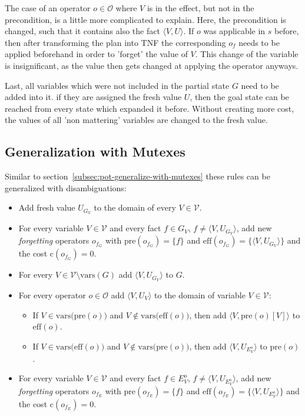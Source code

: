 The case of an operator $o\in\mathcal{O}$ where $V$ is in the effect, but not in the precondition, is a little more complicated to explain.
Here, the precondition is changed, such that it contains also the fact $\langle V, U\rangle$.
If $o$ was applicable in $s$ before, then after transforming the plan into TNF the corresponding $o_f$ needs to be applied beforehand in order to 'forget' the value of $V$.
This change of the variable is insignificant, as the value then gets changed at applying the operator anyways.

Last, all variables which were not included in the partial state $G$ need to be added into it.
if they are assigned the fresh value $U$, then the goal state can be reached from every state which expanded it before.
Without creating more cost, the values of all 'non mattering' variables are changed to the fresh value.

\subsection{Generalization with Mutexes}\label{subsec:tnf-generalize-with-mutexes}
Similar to section~\ref{subsec:pot-generalize-with-mutexes} these rules can be generalized with disambiguations:

\begin{itemize}
    \item Add fresh value $U_{G_V}$ to the domain of every $V\in\mathcal{V}$.
    \item For every variable $V\in\mathcal{V}$ and every fact $f\in G_V$, $f\neq\langle V,U_{G_V}\rangle$, add new \textit{forgetting} operators $o_{f_G}$ with $\text{pre}(o_{f_G})=\{f\}$ and $\text{eff}(o_{f_G})=\{\langle V,U_{G_V}\rangle\}$ and the cost $\text{c}(o_{f_G})=0$.
    \item For every $V\in\mathcal{V}\setminus\text{vars}(G)$ add $\langle V,U_{G_V}\rangle$ to $G$.
    \item For every operator $o\in\mathcal{O}$ add $\langle V,U_V\rangle$ to the domain of variable $V\in\mathcal{V}$:
    \begin{itemize}
        \item If $V\in\text{vars(pre}(o))$ and $V\notin\text{vars(eff}(o))$, then add $\langle V,\text{pre}(o)[V]\rangle$ to $\text{eff}(o)$.
        \item If $V\in\text{vars(eff}(o))$ and $V\notin\text{vars(pre}(o))$, then add $\langle V,U_{E^o_V}\rangle$ to $\text{pre}(o)$.
    \end{itemize}
    \item For every variable $V\in\mathcal{V}$ and every fact $f\in E_V^o$, $f\neq\langle V,U_{E^o_V}\rangle$, add new \textit{forgetting} operators $o_{f_E}$ with $\text{pre}(o_{f_E})=\{f\}$ and $\text{eff}(o_{f_E})=\{\langle V,U_{E^o_V}\rangle\}$ and the cost $\text{c}(o_{f_E})=0$.
\end{itemize}

